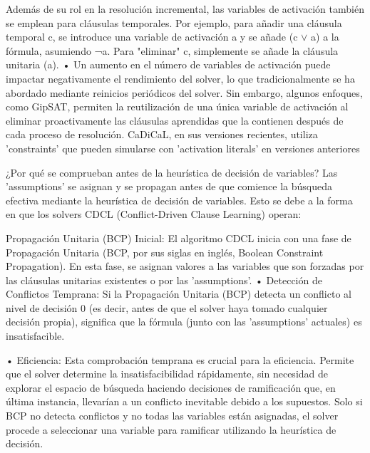 Además de su rol en la resolución incremental, las variables de activación también se emplean para cláusulas temporales. Por ejemplo, para añadir una cláusula temporal c, se introduce una variable de activación a y se añade (c $\lor$ a) a la fórmula, asumiendo ¬a. Para "eliminar" c, simplemente se añade la cláusula unitaria (a).
•
Un aumento en el número de variables de activación puede impactar negativamente el rendimiento del solver, lo que tradicionalmente se ha abordado mediante reinicios periódicos del solver. Sin embargo, algunos enfoques, como GipSAT, permiten la reutilización de una única variable de activación al eliminar proactivamente las cláusulas aprendidas que la contienen después de cada proceso de resolución. %
CaDiCaL, en sus versiones recientes, utiliza 'constraints' que pueden simularse con 'activation literals' en versiones anteriores %

¿Por qué se comprueban antes de la heurística de decisión de variables?
Las 'assumptions' se asignan y se propagan antes de que comience la búsqueda efectiva mediante la heurística de decisión de variables. Esto se debe a la forma en que los solvers CDCL (Conflict-Driven Clause Learning) operan: %

Propagación Unitaria (BCP) Inicial: El algoritmo CDCL inicia con una fase de Propagación Unitaria (BCP, por sus siglas en inglés, Boolean Constraint Propagation). En esta fase, se asignan valores a las variables que son forzadas por las cláusulas unitarias existentes o por las 'assumptions'.
•
Detección de Conflictos Temprana: Si la Propagación Unitaria (BCP) detecta un conflicto al nivel de decisión 0 (es decir, antes de que el solver haya tomado cualquier decisión propia), significa que la fórmula (junto con las 'assumptions' actuales) es insatisfacible. %

•
Eficiencia: Esta comprobación temprana es crucial para la eficiencia. Permite que el solver determine la insatisfacibilidad rápidamente, sin necesidad de explorar el espacio de búsqueda haciendo decisiones de ramificación que, en última instancia, llevarían a un conflicto inevitable debido a los supuestos. %
Solo si BCP no detecta conflictos y no todas las variables están asignadas, el solver procede a seleccionar una variable para ramificar utilizando la heurística de decisión.%

